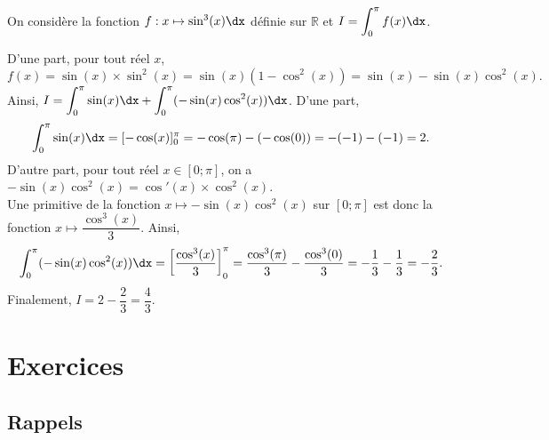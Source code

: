 \documentclass[11pt,fleqn, openany]{book} %
\begin{document}
\begin{example}On considère la fonction $f:x\mapsto \sin^3(x)\dx$ définie sur $\mathbb{R}$ et $I=\displaystyle\int_0^{\pi} f(x)\dx$.

D'une part, pour tout réel $x$,
\[f(x)=\sin(x) \times \sin^2(x) = \sin(x)(1-\cos^2(x))=\sin(x)-\sin(x)\cos^2(x).\]
Ainsi, $I = \displaystyle\int_0^{\pi}\sin(x)\dx+\displaystyle\int_0^{\pi}(-\sin(x)\cos^2(x))\dx$. D'une part, 
\[\displaystyle\int_0^{\pi}\sin(x)\dx = [-\cos(x)]_0^{\pi}=-\cos(\pi)-(-\cos(0))=-(-1)-(-1)=2.\]
D'autre part, pour tout réel $x\in[0;\pi]$, on a $-\sin(x)\cos^2(x)=\cos'(x) \times \cos^2(x)$. \\Une primitive de la fonction $x\mapsto -\sin(x)\cos^2(x)$ sur $[0;\pi]$ est donc la fonction $x\mapsto \dfrac{\cos^3(x)}{3}$. Ainsi,
\[\displaystyle\int_0^{\pi}(-\sin(x)\cos^2(x))\dx=\left[\dfrac{\cos^3(x)}{3}\right]_{0}^{\pi}=\dfrac{\cos^3(\pi)}{3}-\dfrac{\cos^3(0)}{3}=-\dfrac{1}{3}-\dfrac{1}{3}=-\dfrac{2}{3}.\]
Finalement, $I=2-\dfrac{2}{3}=\dfrac{4}{3}$.\end{example}

\chapter{Exercices}

\section*{Rappels}
\end{document}

